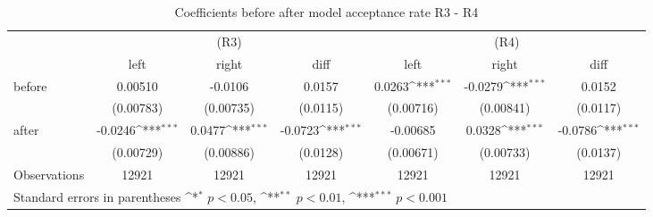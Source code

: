 \begin{table}[!ht]\centering \footnotesize
\def\sym#1{\ifmmode^{#1}\else\(^{#1}\)\fi}
\caption{Coefficients before after model acceptance rate R3 - R4}
\begin{tabular}{l*{6}{c}}
\hline\hline
                    &\multicolumn{3}{c}{(R3)}&\multicolumn{3}{c}{(R4)}\\
&\multicolumn{1}{c}{left}&\multicolumn{1}{c}{right}&\multicolumn{1}{c}{diff}&\multicolumn{1}{c}{left}&\multicolumn{1}{c}{right}&\multicolumn{1}{c}{diff}\\
\hline
before              &     0.00510         &     -0.0106         &      0.0157         &      0.0263\sym{***}&     -0.0279\sym{***}&      0.0152         \\
                    &   (0.00783)         &   (0.00735)         &    (0.0115)         &   (0.00716)         &   (0.00841)         &    (0.0117)         \\
[0,5em]
after               &     -0.0246\sym{***}&      0.0477\sym{***}&     -0.0723\sym{***}&    -0.00685         &      0.0328\sym{***}&     -0.0786\sym{***}\\
                    &   (0.00729)         &   (0.00886)         &    (0.0128)         &   (0.00671)         &   (0.00733)         &    (0.0137)         \\
\hline
Observations        &       12921         &       12921         &       12921         &       12921         &       12921         &       12921         \\
\hline\hline
\multicolumn{7}{l}{\footnotesize Standard errors in parentheses \sym{*} \(p<0.05\), \sym{**} \(p<0.01\), \sym{***} \(p<0.001\)}\\
\end{tabular}
\end{table}
